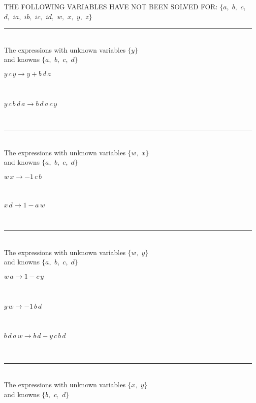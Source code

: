 THE FOLLOWING VARIABLES HAVE NOT BEEN SOLVED FOR:\hfil\break
$\{a,
$ $
b,
$ $
c,
$ $
d,
$ $
ia,
$ $
ib,
$ $
ic,
$ $
id,
$ $
w,
$ $
x,
$ $
y,
$ $
z\}$
\smallskip\\
\rule[3pt]{6in}{.7pt}\\
The expressions with unknown variables $\{y\}$\\
and knowns $\{a,
$ $
b,
$ $
c,
$ $
d\}$\smallskip\\
\begin{minipage}{6in}
$
y\,
 c\,
 y\rightarrow y + b\,
 d\,
 a
$
\end{minipage}\medskip \\
\begin{minipage}{6in}
$
y\,
 c\,
 b\,
 d\,
 a\rightarrow b\,
 d\,
 a\,
 c\,
 y
$
\end{minipage}\\
\rule[3pt]{6in}{.7pt}\\
The expressions with unknown variables $\{w,
$ $
x\}$\\
and knowns $\{a,
$ $
b,
$ $
c,
$ $
d\}$\smallskip\\
\begin{minipage}{6in}
$
w\,
 x\rightarrow -1\,
 c\,
 b
$
\end{minipage}\medskip \\
\begin{minipage}{6in}
$
x\,
 d\rightarrow 1 - a\,
 w
$
\end{minipage}\\
\rule[3pt]{6in}{.7pt}\\
The expressions with unknown variables $\{w,
$ $
y\}$\\
and knowns $\{a,
$ $
b,
$ $
c,
$ $
d\}$\smallskip\\
\begin{minipage}{6in}
$
w\,
 a\rightarrow 1 - c\,
 y
$
\end{minipage}\medskip \\
\begin{minipage}{6in}
$
y\,
 w\rightarrow -1\,
 b\,
 d
$
\end{minipage}\medskip \\
\begin{minipage}{6in}
$
b\,
 d\,
 a\,
 w\rightarrow b\,
 d - y\,
 c\,
 b\,
 d
$
\end{minipage}\\
\rule[3pt]{6in}{.7pt}\\
The expressions with unknown variables $\{x,
$ $
y\}$\\
and knowns $\{b,
$ $
c,
$ $
d\}$\smallskip\\
